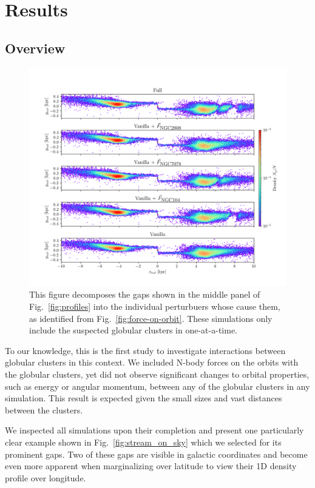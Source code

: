 \documentclass{aa}
\begin{document}
\section{Results}



  \subsection*{Overview}

    \begin{figure}
      \centering
      \includegraphics[width=\linewidth]{decomposition-monte-carlo-009-with-3-gaps.png}
      \caption{This figure decomposes the gaps shown in the middle panel of Fig.~\ref{fig:profiles} into the individual perturbuers whose cause them, as identified from Fig.~\ref{fig:force-on-orbit}. These simulations only include the suspected globular clusters in one-at-a-time.}
      \label{fig:decomposition}
    \end{figure} 

    To our knowledge, this is the first study to investigate interactions between globular clusters in this context. We included N-body forces on the orbits with the globular clusters, yet did not observe significant changes to orbital properties, such as energy or angular momentum, between any of the globular clusters in any simulation. This result is expected given the small sizes and vast distances between the clusters.

    We inspected all simulations upon their completion and present one particularly clear example shown in Fig.~\ref{fig:stream_on_sky} which we selected for its prominent gaps. Two of these gaps are visible in galactic coordinates and become even more apparent when marginalizing over latitude to view their 1D density profile over longitude.
    
\end{document}

